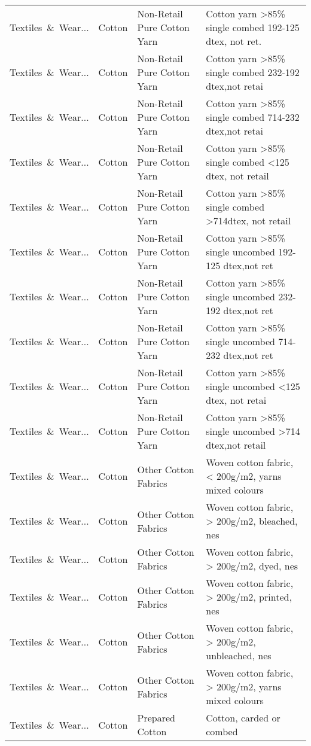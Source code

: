 \begin{appendices}
\begin{xltabular}{\textwidth}{|p{0.10\textwidth}|p{0.25\textwidth}|p{0.24\textwidth}|p{0.31\textwidth}|}
Textiles\ \&\ Wear... & Cotton & Non-Retail Pure Cotton Yarn & Cotton yarn >85\% single combed 192-125 dtex, not ret. \\
Textiles\ \&\ Wear... & Cotton & Non-Retail Pure Cotton Yarn & Cotton yarn >85\% single combed 232-192 dtex,not retai \\
Textiles\ \&\ Wear... & Cotton & Non-Retail Pure Cotton Yarn & Cotton yarn >85\% single combed 714-232 dtex,not retai \\
Textiles\ \&\ Wear... & Cotton & Non-Retail Pure Cotton Yarn & Cotton yarn >85\% single combed <125 dtex, not retail \\
Textiles\ \&\ Wear... & Cotton & Non-Retail Pure Cotton Yarn & Cotton yarn >85\% single combed >714dtex, not retail \\
Textiles\ \&\ Wear... & Cotton & Non-Retail Pure Cotton Yarn & Cotton yarn >85\% single uncombed 192-125 dtex,not ret \\
Textiles\ \&\ Wear... & Cotton & Non-Retail Pure Cotton Yarn & Cotton yarn >85\% single uncombed 232-192 dtex,not ret \\
Textiles\ \&\ Wear... & Cotton & Non-Retail Pure Cotton Yarn & Cotton yarn >85\% single uncombed 714-232 dtex,not ret \\
Textiles\ \&\ Wear... & Cotton & Non-Retail Pure Cotton Yarn & Cotton yarn >85\% single uncombed <125 dtex, not retai \\
Textiles\ \&\ Wear... & Cotton & Non-Retail Pure Cotton Yarn & Cotton yarn >85\% single uncombed >714 dtex,not retail \\
Textiles\ \&\ Wear... & Cotton & Other Cotton Fabrics & Woven cotton fabric, < 200g/m2, yarns mixed colours \\
Textiles\ \&\ Wear... & Cotton & Other Cotton Fabrics & Woven cotton fabric, > 200g/m2, bleached, nes \\
Textiles\ \&\ Wear... & Cotton & Other Cotton Fabrics & Woven cotton fabric, > 200g/m2, dyed, nes \\
Textiles\ \&\ Wear... & Cotton & Other Cotton Fabrics & Woven cotton fabric, > 200g/m2, printed, nes \\
Textiles\ \&\ Wear... & Cotton & Other Cotton Fabrics & Woven cotton fabric, > 200g/m2, unbleached, nes \\
Textiles\ \&\ Wear... & Cotton & Other Cotton Fabrics & Woven cotton fabric, > 200g/m2, yarns mixed colours \\
Textiles\ \&\ Wear... & Cotton & Prepared Cotton & Cotton, carded or combed \\

\end{xltabular}
\end{appendices}

